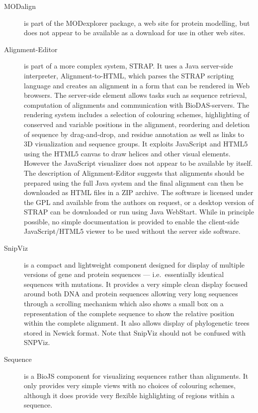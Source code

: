 \documentclass[10pt,a4paper,twocolumn]{article}
\begin{document}
\begin{description}
\item[MODalign] is part of the MODexplorer
  package\cite{kosinski:2013}, a web site for protein modelling, but
  does not appear to be available as a download for use in other web
  sites.
\item[Alignment-Editor] is part of a more complex system, STRAP. It
  uses a Java server-side interpreter,
  Alignment-to-HTML\cite{gille:2014}, which parses the STRAP scripting
  language and creates an alignment in a form that can be rendered in
  Web browsers. The server-side element allows tasks such as sequence
  retrieval, computation of alignments and communication with
  BioDAS-servers. The rendering system includes a selection of
  colouring schemes, highlighting of conserved and variable positions
  in the alignment, reordering and deletion of sequence by
  drag-and-drop, and residue annotation as well as links to 3D
  visualization and sequence groups. It exploits JavaScript and HTML5
  using the HTML5 canvas to draw helices and other visual elements.
  However the JavaScript visualizer does not appear to be available by
  itself. The description of Alignment-Editor\cite{gille:2014aa}
  suggests that alignments should be prepared using the full Java
  system and the final alignment can then be downloaded as HTML files
  in a ZIP archive. The software is licensed under the GPL and
  available from the authors on request, or a desktop version of STRAP
  can be downloaded or run using Java WebStart. While in principle
  possible, no simple documentation is provided to enable the
  client-side JavaScript/HTML5 viewer to be used without the server
  side software.
\item[SnipViz] is a compact and lightweight component designed for
  display of multiple versions of gene and protein sequences --- i.e.\
  essentially identical sequences with mutations.  It provides a very
  simple clean display focused around both DNA and protein sequences
  allowing very long sequences through a scrolling mechanism which
  also shows a small box on a representation of the complete sequence
  to show the relative position within the complete alignment.  It
  also allows display of phylogenetic trees stored in Newick
  format. Note that SnipViz should not be confused with
  SNPViz\cite{langewisch:snpviz}.
\item[Sequence] is a BioJS component for visualizing sequences rather
  than alignments.  It only provides very simple views with no choices
  of colouring schemes, although it does provide very flexible
  highlighting of regions within a sequence.
\end{description}
\end{document}
